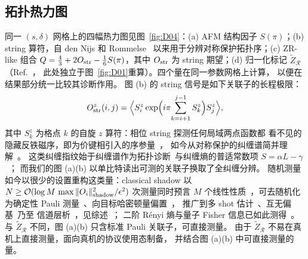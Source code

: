 \subsection{拓扑热力图}
\label{sec:heatmaps}

同一 $(s,\delta)$ 网格上的四幅热力图见图~\ref{fig:D04}：(a) AFM 结构因子
$S(\pi)$；(b) string 算符，自 den Nijs 和 Rommelse~\cite{dennijs1989preroughening}
以来用于分辨对称保护拓扑序；(c) ZR-like 组合
$Q=\frac{4}{3}+2O_{\rm str}-\frac{1}{6}S(\pi)$，其中 $O_{\rm str}$ 为 string
期望；(d) 归一化标记 $\tilde{Z}_{\mathcal R}$（Ref.~\cite{elben2020manybody}，
此处独立于图~\ref{fig:D01}重算）。四个量在同一参数网格上计算，
以便在结果部分统一比较其诊断作用。
图 (b) 的 string 信号是如下关联子的长程极限：
\begin{equation}
O^z_{\rm str}(i,j)=\Big\langle S^z_i\exp\!\Big(i\pi\!\sum_{k=i+1}^{j-1}S^z_k\Big)S^z_j\Big\rangle,
\end{equation}
其中 $S^z_k$ 为格点 $k$ 的自旋 $z$ 算符：相位 string 探测任何局域两点函数都
看不见的隐藏反铁磁序，即为价键相引入的序参量~\cite{dennijs1989preroughening}，
如今从对称保护的纠缠谱简并理解~\cite{pollmann2010entanglement}。
这类纠缠指纹始于纠缠谱作为拓扑诊断~\cite{li2008entanglement}与纠缠熵的普适常数项
$S=\alpha L-\gamma$~\cite{kitaev2006topological,levin2006detecting}；
而我们的图 (a)(b) 以单比特读出可测的关联子换取了全纠缠分辨。
随机测量如今以很少的设置重构这类量：classical shadow 以
$N\ge{\cal O}(\log M\,\max\|O_i\|^2_{\rm shadow}/\epsilon^2)$ 次测量同时预言
$M$ 个线性性质~\cite{huang2020predicting}，可去随机化为确定性 Pauli
测量~\cite{huang2021derandomization}、向目标哈密顿量偏置~\cite{hadfield2022measurements}，
推广到多 shot 估计~\cite{zhou2023performance}、互无偏基~\cite{wang2023classical}乃至
信道层析~\cite{kunjummen2023shadow}，见综述~\cite{elben2022toolbox}；
二阶 R\'enyi 熵与量子 Fisher 信息已如此测得~\cite{brydges2019probing,vitale2024robust}。
与 $\tilde{Z}_{\mathcal R}$ 不同，图 (a)(b) 只含标准 Pauli 关联子，可直接测量。
由于 $\tilde{Z}_{\mathcal R}$ 不易在真机上直接测量，面向真机的协议使用态制备，
并结合图 (a)(b) 中可直接测量的量。

